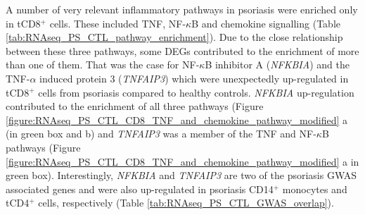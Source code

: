 A number of very relevant inflammatory pathways in psoriasis were enriched only in tCD8$^+$ cells. These included TNF, NF-$\kappa$B and chemokine signalling (Table \ref{tab:RNAseq_PS_CTL_pathway_enrichment}). Due to the close relationship between these three pathways, some DEGs contributed to the enrichment of more than one of them. That was the case for NF-$\kappa$B inhibitor A (\textit{NFKBIA}) and the TNF-$\alpha$ induced protein 3 (\textit{TNFAIP3}) which were unexpectedly up-regulated in tCD8$^+$ cells from psoriasis compared to healthy controls. \textit{NFKBIA} up-regulation contributed to the enrichment of all three pathways (Figure \ref{figure:RNAseq_PS_CTL_CD8_TNF_and_chemokine_pathway_modified} a (in green box and b) and \textit{TNFAIP3} was a member of the TNF and NF-$\kappa$B pathways (Figure \ref{figure:RNAseq_PS_CTL_CD8_TNF_and_chemokine_pathway_modified} a in green box). Interestingly, \textit{NFKBIA} and \textit{TNFAIP3} are two of the psoriasis GWAS associated genes and were also up-regulated in psoriasis CD14$^+$ monocytes and tCD4$^+$ cells, respectively (Table \ref{tab:RNAseq_PS_CTL_GWAS_overlap}).



